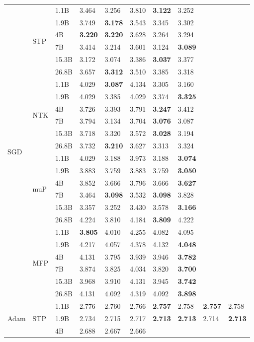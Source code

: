 \begin{table}[h!]
{\begin{tabularx}{1.65\textwidth}{XXX | XXXXXXX}
\multirow{24}{*}{\Large SGD} & \multirow{6}{*}{\Large STP } & 1.1B & 3.464 & 3.256 & 3.810 & \textbf{3.122} & 3.252 &  &  \\ &  & 1.9B & 3.749 & \textbf{3.178} & 3.543 & 3.345 & 3.302 &  &  \\ &  & 4B & \textbf{3.220} & \textbf{3.220} & 3.628 & 3.264 & 3.294 &  &  \\ &  & 7B & 3.414 & 3.214 & 3.601 & 3.124 & \textbf{3.089} &  &  \\ &  & 15.3B & 3.172 & 3.074 & 3.386 & \textbf{3.037} & 3.377 &  &  \\ &  & 26.8B & 3.657 & \textbf{3.312} & 3.510 & 3.385 & 3.318 &  &  \\  \cmidrule{2-10}  & \multirow{6}{*}{\Large NTK } & 1.1B & 4.029 & \textbf{3.087} & 4.134 & 3.305 & 3.160 &  &  \\ &  & 1.9B & 4.029 & 3.385 & 4.029 & 3.374 & \textbf{3.325} &  &  \\ &  & 4B & 3.726 & 3.393 & 3.791 & \textbf{3.247} & 3.412 &  &  \\ &  & 7B & 3.794 & 3.134 & 3.704 & \textbf{3.076} & 3.087 &  &  \\ &  & 15.3B & 3.718 & 3.320 & 3.572 & \textbf{3.028} & 3.194 &  &  \\ &  & 26.8B & 3.732 & \textbf{3.210} & 3.627 & 3.313 & 3.324 &  &  \\  \cmidrule{2-10}  & \multirow{6}{*}{\Large muP } & 1.1B & 4.029 & 3.188 & 3.973 & 3.188 & \textbf{3.074} &  &  \\ &  & 1.9B & 3.883 & 3.759 & 3.883 & 3.759 & \textbf{3.050} &  &  \\ &  & 4B & 3.852 & 3.666 & 3.796 & 3.666 & \textbf{3.627} &  &  \\ &  & 7B & 3.464 & \textbf{3.098} & 3.532 & \textbf{3.098} & 3.828 &  &  \\ &  & 15.3B & 3.357 & 3.252 & 3.430 & 3.578 & \textbf{3.166} &  &  \\ &  & 26.8B & 4.224 & 3.810 & 4.184 & \textbf{3.809} & 4.222 &  &  \\  \cmidrule{2-10}  & \multirow{6}{*}{\Large MFP } & 1.1B & \textbf{3.805} & 4.010 & 4.255 & 4.082 & 4.095 &  &  \\ &  & 1.9B & 4.217 & 4.057 & 4.378 & 4.132 & \textbf{4.048} &  &  \\ &  & 4B & 4.131 & 3.795 & 3.939 & 3.946 & \textbf{3.782} &  &  \\ &  & 7B & 3.874 & 3.825 & 4.034 & 3.820 & \textbf{3.700} &  &  \\ &  & 15.3B & 3.968 & 3.910 & 4.131 & 3.945 & \textbf{3.742} &  &  \\ &  & 26.8B & 4.131 & 4.092 & 4.319 & 4.092 & \textbf{3.898} &  &  \\  \midrule[\heavyrulewidth] \multirow{24}{*}{\Large Adam} & \multirow{6}{*}{\Large STP } & 1.1B & 2.776 & 2.760 & 2.766 & \textbf{2.757} & 2.758 & \textbf{2.757} & 2.758 \\ &  & 1.9B & 2.734 & 2.715 & 2.717 & \textbf{2.713} & \textbf{2.713} & 2.714 & \textbf{2.713} \\ &  & 4B & 2.688 & 2.667 & 2.666 & 
\end{tabularx}}
\end{table}
